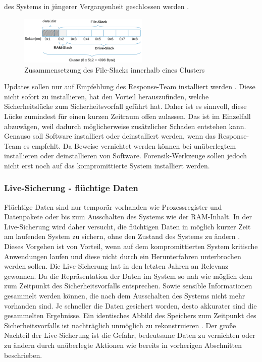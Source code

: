 \documentclass[12pt,DIV=14, version=first, BCOR=10mm,a4paper,twoside,parskip=half-,headsepline,headinclude]{scrartcl}
\begin{document}
des Systems in jüngerer Vergangenheit geschlossen werden \cite[vgl. S. 132-133]{texbook02}.
        \begin{figure}[h] 
    		\centering %
    		\includegraphics[width=0.55\textwidth]{bilder/File-Slack.PNG}
    		\caption{Zusammensetzung des File-Slacks innerhalb eines Clusters \cite[S. 133]{texbook02}}
		    \label{fig:fileslack}
	    \end{figure}
	    
        Updates sollen nur auf Empfehlung des Response-Team installiert werden \cite[vgl. S. 87]{texbook01}. Diese nicht sofort zu installieren, hat den Vorteil herauszufinden, welche Sicherheitslücke zum Sicherheitsvorfall geführt hat. Daher ist es sinnvoll, diese Lücke zumindest für einen kurzen Zeitraum offen zulassen. Das ist im Einzelfall abzuwägen, weil dadurch möglicherweise zusätzlicher Schaden entstehen kann. Genauso soll Software installiert oder deinstalliert werden, wenn das Response-Team es empfehlt. Da Beweise vernichtet werden können bei unüberlegtem installieren oder deinstallieren von Software. Forensik-Werkzeuge sollen jedoch nicht erst noch auf das kompromittierte System installiert werden. 
        
	    \subsubsection{Live-Sicherung - flüchtige Daten}
	    Flüchtige Daten sind nur temporär vorhanden wie Prozessregister und Datenpakete oder bis zum Ausschalten des Systems wie der RAM-Inhalt. In der Live-Sicherung wird daher versucht, die flüchtigen Daten in möglich kurzer Zeit am laufenden System zu sichern, ohne den Zustand des Systems zu ändern \cite[vgl. S. 119]{texbook02}. Dieses Vorgehen ist von Vorteil, wenn auf dem kompromittierten System kritische Anwendungen laufen und diese nicht durch ein Herunterfahren unterbrochen werden sollen. Die Live-Sicherung hat in den letzten Jahren an Relevanz gewonnen. Da die Repräsentation der Daten im System so nah wie möglich dem zum Zeitpunkt des Sicherheitsvorfalls entsprechen. Sowie sensible Informationen gesammelt werden können, die nach dem Ausschalten des Systems nicht mehr vorhanden sind. Je schneller die Daten gesichert worden, desto akkurater sind die gesammelten Ergebnisse. Ein identisches Abbild des Speichers zum Zeitpunkt des Sicherheitsvorfalls ist nachträglich unmöglich zu rekonstruieren \cite[vgl. S. 113]{texbook04}. Der große Nachteil der Live-Sicherung ist die Gefahr, bedeutsame Daten zu vernichten oder zu ändern durch unüberlegte Aktionen wie bereits in vorherigen Abschnitten beschrieben.
\end{document}
